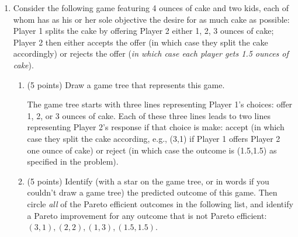 \documentclass{article}
\newcommand{\mybigskip}{\vspace{1in}}
\begin{document}
\begin{enumerate}
\begin{comment}
    \end{enumerate}

\begin{EXAM}
\vspace{.3in}%
\end{EXAM}
\end{comment}











\item \begin{EXAM} Consider the following game featuring 4 ounces of cake and two kids, each of whom has as his or her sole objective the desire for as much cake as possible: Player 1 splits the cake by offering Player 2 either 1, 2, 3 ounces of cake; Player 2 then either accepts the offer (in which case they split the cake accordingly) or rejects the offer (\emph{in which case each player gets 1.5 ounces of cake}). \end{EXAM}

    \begin{enumerate}
    \item \begin{EXAM} (5 points) Draw a game tree that represents this game. \vspace*{2.6in}\end{EXAM}

\begin{KEY}
The game tree starts with three lines representing Player 1's choices: offer 1, 2, or 3 ounces of cake. Each of these three lines leads to two lines representing Player 2's response if that choice is make: accept (in which case they split the cake according, e.g., (3,1) if Player 1 offers Player 2 one ounce of cake) or reject (in which case the outcome is (1.5,1.5) as specified in the problem).
\end{KEY}


    \item \begin{EXAM} (5 points) Identify (with a star on the game tree, or in words if you couldn't draw a game tree) the predicted outcome of this game. Then circle \emph{all} of the Pareto efficient outcomes in the following list, and identify a Pareto improvement for any outcome that is not Pareto efficient: $(3,1), (2,2), (1,3), (1.5,1.5)$. \clearpage \end{EXAM}


\end{enumerate}
\end{enumerate}
\end{document}
